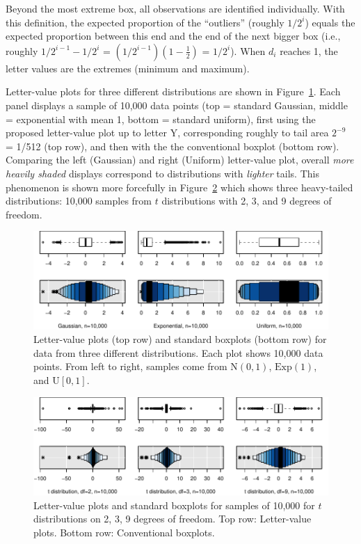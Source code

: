 \documentclass[oneside]{article}
\begin{document}
Beyond the most extreme box, all observations are identified individually. With this definition, the expected proportion of the ``outliers'' (roughly $1/2^i$) equals the expected proportion between this end and the end of the next bigger box (i.e., roughly $1/2^{i-1} - 1/2^i$ = $(1/2^{i-1})(1 - \frac{1}{2})$ = $1 / 2^i$). When $d_i$ reaches 1, the letter values are the extremes (minimum and maximum).

Letter-value plots for three different distributions are shown in Figure~\ref{stackbox}. Each panel displays a sample of 10,000 data points (top = standard Gaussian, middle = exponential with mean 1, bottom = standard uniform), first using the proposed letter-value plot up to letter Y, corresponding roughly to tail area $2^{-9}$ = 1/512 (top row), and then with the the conventional boxplot (bottom row). Comparing the left (Gaussian) and right (Uniform) letter-value plot, overall \textit{more heavily shaded} displays correspond to distributions with \textit{lighter} tails. This phenomenon is shown more forcefully in Figure~\ref{t-dist} which shows three heavy-tailed distributions: 10,000 samples from $t$ distributions with 2, 3, and 9 degrees of freedom.

\begin{figure}[hbtp]
  \centering
  \includegraphics[width = \linewidth]{boxplots}

  \caption{Letter-value plots (top row) and standard boxplots (bottom row) for
  data from three different distributions. Each plot shows 10,000 data points.
  From left to right, samples come from $\mbox{N}(0,1)$, $\mbox{Exp}(1)$, and
  $\mbox{U}[0,1]$. }

  \label{stackbox}
\end{figure}

\begin{figure}[hbtp]
  \centering
  \includegraphics[width = \linewidth]{t-dist}
  
  \caption{Letter-value plots and standard boxplots for samples of 10,000
  for $t$ distributions on 2, 3, 9 degrees of freedom. Top row: Letter-value
  plots. Bottom row: Conventional boxplots.}
  \label{t-dist}
\end{figure}
\end{document}
